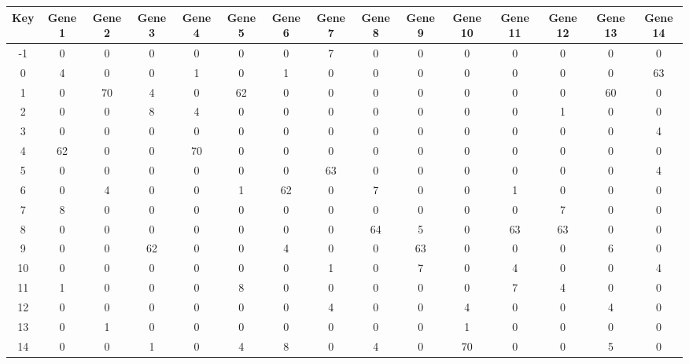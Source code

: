 \begin{tabular}{|c|c|c|c|c|c|c|c|c|c|c|c|c|c|c|}
\hline
Key & Gene 1 & Gene 2 & Gene 3 & Gene 4 & Gene 5 & Gene 6 & Gene 7 & Gene 8 & Gene 9 & Gene 10 & Gene 11 & Gene 12 & Gene 13 & Gene 14 \\
\hline
-1 & 0 & 0 & 0 & 0 & 0 & 0 & 7 & 0 & 0 & 0 & 0 & 0 & 0 & 0 \\
0 & 4 & 0 & 0 & 1 & 0 & 1 & 0 & 0 & 0 & 0 & 0 & 0 & 0 & 63 \\
1 & 0 & 70 & 4 & 0 & 62 & 0 & 0 & 0 & 0 & 0 & 0 & 0 & 60 & 0 \\
2 & 0 & 0 & 8 & 4 & 0 & 0 & 0 & 0 & 0 & 0 & 0 & 1 & 0 & 0 \\
3 & 0 & 0 & 0 & 0 & 0 & 0 & 0 & 0 & 0 & 0 & 0 & 0 & 0 & 4 \\
4 & 62 & 0 & 0 & 70 & 0 & 0 & 0 & 0 & 0 & 0 & 0 & 0 & 0 & 0 \\
5 & 0 & 0 & 0 & 0 & 0 & 0 & 63 & 0 & 0 & 0 & 0 & 0 & 0 & 4 \\
6 & 0 & 4 & 0 & 0 & 1 & 62 & 0 & 7 & 0 & 0 & 1 & 0 & 0 & 0 \\
7 & 8 & 0 & 0 & 0 & 0 & 0 & 0 & 0 & 0 & 0 & 0 & 7 & 0 & 0 \\
8 & 0 & 0 & 0 & 0 & 0 & 0 & 0 & 64 & 5 & 0 & 63 & 63 & 0 & 0 \\
9 & 0 & 0 & 62 & 0 & 0 & 4 & 0 & 0 & 63 & 0 & 0 & 0 & 6 & 0 \\
10 & 0 & 0 & 0 & 0 & 0 & 0 & 1 & 0 & 7 & 0 & 4 & 0 & 0 & 4 \\
11 & 1 & 0 & 0 & 0 & 8 & 0 & 0 & 0 & 0 & 0 & 7 & 4 & 0 & 0 \\
12 & 0 & 0 & 0 & 0 & 0 & 0 & 4 & 0 & 0 & 4 & 0 & 0 & 4 & 0 \\
13 & 0 & 1 & 0 & 0 & 0 & 0 & 0 & 0 & 0 & 1 & 0 & 0 & 0 & 0 \\
14 & 0 & 0 & 1 & 0 & 4 & 8 & 0 & 4 & 0 & 70 & 0 & 0 & 5 & 0 \\
\hline
\end{tabular}